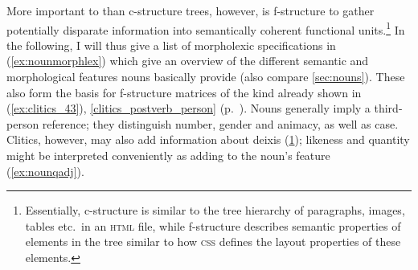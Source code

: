 More important to \Lfg{} than c-structure trees, however, is f-structure to
gather potentially disparate information into semantically coherent functional
units.\footnote{Essentially, c-structure is similar to the tree hierarchy of
paragraphs, images, tables etc.\ in an \textsc{html} file, while f-structure
describes semantic properties of elements in the tree similar to how
\textsc{css} defines the layout properties of these elements.} In the
following, I will thus give a list of morpholexic specifications in
(\ref{ex:nounmorphlex}) which give an overview of the different semantic and
morphological features nouns basically provide (also compare
\autoref{sec:nouns}). These also form the basis for f-structure matrices of the
kind already shown in (\ref{ex:clitics_43}),
\autoref{clitics_postverb_person} (p.~\pageref{ex:clitics_43}). Nouns generally
imply a third-person reference; they distinguish number, gender and animacy, as
well as case. Clitics, however, may also add information about deixis
(\ref{ex:deixisfeat}); likeness and quantity might be interpreted conveniently
as adding to the noun's \Adjc{} feature (\ref{ex:nounqadj}).

\begin{figure}[h]
\begin{morphlex}
\pex\label{ex:nounmorphlex}%
\a{}

\a\label{ex:deixisfeat}
\xe
\end{morphlex}
\end{figure}

